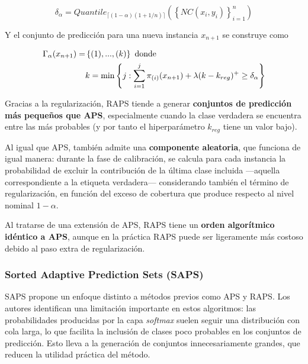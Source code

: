 $$
\delta_\alpha = Quantile_{ \lceil  (1-\alpha) (1 + 1/n)  \rceil } \left( \left\{ NC(x_i,y_i) \right\}_{i=1}^n \right)
$$

Y el conjunto de predicción para una nueva instancia $x_{n+1}$ se construye como

\begin{align*} 
\Gamma_\alpha(x_{n+1})= &\left\{ (1), ..., (k) \right\} \textnormal{ donde }\\
& k = \min \left\{ j: \sum_{i=1}^{j} \pi_{(i)}(x_{n+1}) + \lambda (k-k_{reg})^+  \ge \delta_\alpha \right\}
\end{align*}

Gracias a la regularización, \acrshort{RAPS} tiende a generar \textbf{conjuntos de predicción más pequeños que \acrshort{APS}}, especialmente cuando la clase verdadera se encuentra entre las más probables (y por tanto el hiperparámetro $k_{reg}$ tiene un valor bajo).

Al igual que \acrshort{APS}, también admite una \textbf{componente aleatoria}, que funciona de igual manera: durante la fase de calibración, se calcula para cada instancia la probabilidad de excluir la contribución de la última clase incluida ---aquella correspondiente a la etiqueta verdadera--- considerando también el término de regularización, en función del exceso de cobertura que produce respecto al nivel nominal $1-\alpha$.

Al tratarse de una extensión de \acrshort{APS}, \acrshort{RAPS} tiene un \textbf{orden algorítmico idéntico a \acrshort{APS}}, aunque en la práctica \acrshort{RAPS} puede ser ligeramente más costoso debido al paso extra de regularización. 


\subsubsection{Sorted Adaptive Prediction Sets (SAPS)}

\acrshort{SAPS} \cite{huang2023conformal} propone un enfoque distinto a métodos previos como \acrshort{APS} y \acrshort{RAPS}. Los autores identifican una limitación importante en estos algoritmos: las probabilidades producidas por la capa \textit{softmax} suelen seguir una distribución con cola larga, lo que facilita la inclusión de clases poco probables en los conjuntos de predicción. Esto lleva a la generación de conjuntos innecesariamente grandes, que reducen la utilidad práctica del método.

